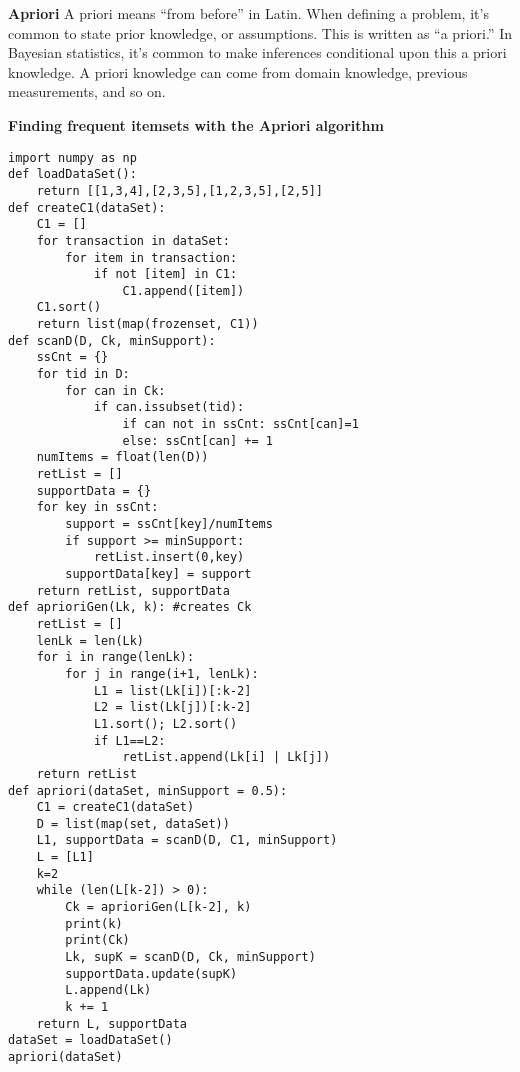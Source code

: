 \documentclass[letterpaper, 10 pt, conference]{ieeeconf}
\begin{document}
\textbf{Apriori}
A priori means “from before” in Latin. When defining a problem, it’s common to state prior knowledge, or assumptions. This is written as “a priori.” In Bayesian statistics, it’s common to make inferences conditional upon this a priori knowledge. A priori knowledge can come from domain knowledge, previous measurements, and so on.

\textbf{Finding frequent itemsets with the Apriori algorithm}

\begin{lstlisting}
import numpy as np
def loadDataSet():
    return [[1,3,4],[2,3,5],[1,2,3,5],[2,5]]
def createC1(dataSet):
    C1 = []
    for transaction in dataSet:
        for item in transaction:
            if not [item] in C1:
                C1.append([item])
    C1.sort()
    return list(map(frozenset, C1))
def scanD(D, Ck, minSupport):
    ssCnt = {}
    for tid in D:
        for can in Ck:
            if can.issubset(tid):
                if can not in ssCnt: ssCnt[can]=1
                else: ssCnt[can] += 1
    numItems = float(len(D))
    retList = []
    supportData = {}
    for key in ssCnt:
        support = ssCnt[key]/numItems
        if support >= minSupport:
            retList.insert(0,key)
        supportData[key] = support
    return retList, supportData
def aprioriGen(Lk, k): #creates Ck
    retList = []
    lenLk = len(Lk)
    for i in range(lenLk):
        for j in range(i+1, lenLk):
            L1 = list(Lk[i])[:k-2]
            L2 = list(Lk[j])[:k-2]
            L1.sort(); L2.sort()
            if L1==L2:
                retList.append(Lk[i] | Lk[j])
    return retList
def apriori(dataSet, minSupport = 0.5):
    C1 = createC1(dataSet)
    D = list(map(set, dataSet))
    L1, supportData = scanD(D, C1, minSupport)
    L = [L1]
    k=2
    while (len(L[k-2]) > 0):
        Ck = aprioriGen(L[k-2], k)
        print(k)
        print(Ck)
        Lk, supK = scanD(D, Ck, minSupport)
        supportData.update(supK)
        L.append(Lk)
        k += 1
    return L, supportData
dataSet = loadDataSet()
apriori(dataSet)
\end{lstlisting}
\end{document}
